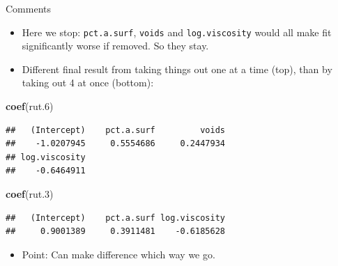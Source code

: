 \documentclass[
  ignorenonframetext,
]{beamer}
\newenvironment{Shaded}{\begin{snugshade}}{\end{snugshade}}
\newcommand{\FloatTok}[1]{\textcolor[rgb]{0.00,0.00,0.81}{#1}}
\newcommand{\KeywordTok}[1]{\textcolor[rgb]{0.13,0.29,0.53}{\textbf{#1}}}
\newcommand{\NormalTok}[1]{#1}
\providecommand{\tightlist}{%
  \setlength{\itemsep}{0pt}\setlength{\parskip}{0pt}}
\begin{document}
\begin{frame}[fragile]{Comments}
\protect\hypertarget{comments-21}{}

\begin{itemize}
\tightlist
\item
  Here we stop: \texttt{pct.a.surf}, \texttt{voids} and
  \texttt{log.viscosity} would all make fit significantly worse if
  removed. So they stay.
\item
  Different final result from taking things out one at a time (top),
  than by taking out 4 at once (bottom):
\end{itemize}

\begin{Shaded}
\begin{Highlighting}[]
\KeywordTok{coef}\NormalTok{(rut}\FloatTok{.6}\NormalTok{)}
\end{Highlighting}
\end{Shaded}

\begin{verbatim}
##   (Intercept)    pct.a.surf         voids 
##    -1.0207945     0.5554686     0.2447934 
## log.viscosity 
##    -0.6464911
\end{verbatim}

\begin{Shaded}
\begin{Highlighting}[]
\KeywordTok{coef}\NormalTok{(rut}\FloatTok{.3}\NormalTok{)}
\end{Highlighting}
\end{Shaded}

\begin{verbatim}
##   (Intercept)    pct.a.surf log.viscosity 
##     0.9001389     0.3911481    -0.6185628
\end{verbatim}

\begin{itemize}
\tightlist
\item
  Point: Can make difference which way we go.
\end{itemize}

\end{frame}
\end{document}
